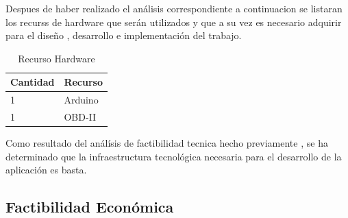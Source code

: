 Despues de haber realizado el análisis correspondiente a continuacion se listaran los recurss de hardware que serán utilizados y que a su vez es necesario adquirir para el diseño , desarrollo e implementación del trabajo.\\

\begin{table}[htbp]
		\begin{tabular}{|p{5cm}|p{7cm}|}
	\hline
		Cantidad & Recurso \\
	\hline
	\hline
		1&Arduino\\
	\hline
	\hline
		1&OBD-II \\
	\hline
				\end{tabular}
				\caption{Recurso Hardware}
				\label{disenoEstructura:rechardware}
				\end{table}
Como resultado del análísis de factibilidad tecnica hecho previamente , se ha determinado que la infraestructura tecnológica necesaria para el desarrollo de la aplicación es basta.

\subsection{Factibilidad Económica}
%
%
%
%

